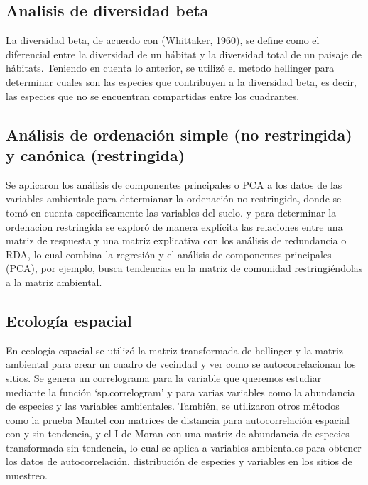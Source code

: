 \documentclass[11pt,]{article}
\begin{document}
\subsection{Analisis de diversidad
beta}\label{analisis-de-diversidad-beta}

La diversidad beta, de acuerdo con (Whittaker, 1960), se define como el
diferencial entre la diversidad de un hábitat y la diversidad total de
un paisaje de hábitats. Teniendo en cuenta lo anterior, se utilizó el
metodo hellinger para determinar cuales son las especies que contribuyen
a la diversidad beta, es decir, las especies que no se encuentran
compartidas entre los cuadrantes.

\subsection{Análisis de ordenación simple (no restringida) y canónica
(restringida)}\label{anuxe1lisis-de-ordenaciuxf3n-simple-no-restringida-y-canuxf3nica-restringida}

Se aplicaron los análisis de componentes principales o PCA a los datos
de las variables ambientale para determianar la ordenación no
restringida, donde se tomó en cuenta especificamente las variables del
suelo. y para determinar la ordenacion restringida se exploró de manera
explícita las relaciones entre una matriz de respuesta y una matriz
explicativa con los análisis de redundancia o RDA, lo cual combina la
regresión y el análisis de componentes principales (PCA), por ejemplo,
busca tendencias en la matriz de comunidad restringiéndolas a la matriz
ambiental.

\subsection{Ecología espacial}\label{ecologuxeda-espacial}

En ecología espacial se utilizó la matriz transformada de hellinger y la
matriz ambiental para crear un cuadro de vecindad y ver como se
autocorrelacionan los sitios. Se genera un correlograma para la variable
que queremos estudiar mediante la función `sp.correlogram' y para varias
variables como la abundancia de especies y las variables ambientales.
También, se utilizaron otros métodos como la prueba Mantel con matrices
de distancia para autocorrelación espacial con y sin tendencia, y el I
de Moran con una matriz de abundancia de especies transformada sin
tendencia, lo cual se aplica a variables ambientales para obtener los
datos de autocorrelación, distribución de especies y variables en los
sitios de muestreo.
\end{document}
